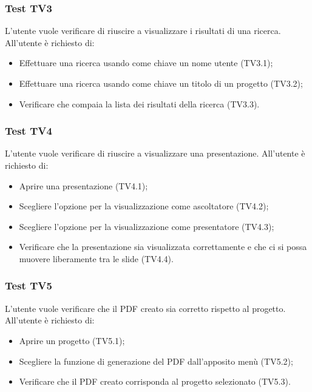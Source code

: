 \subsubsection{Test TV3}
L'utente vuole verificare di riuscire a visualizzare i risultati di una ricerca. \newline
All'utente è richiesto di:
\begin{itemize}
	\item Effettuare una ricerca usando come chiave un nome utente (TV3.1);
	\item Effettuare una ricerca usando come chiave un titolo di un progetto (TV3.2);
	\item Verificare che compaia la lista dei risultati della ricerca (TV3.3).
\end{itemize}

\subsubsection{Test TV4}
L'utente vuole verificare di riuscire a visualizzare una presentazione. \newline
All'utente è richiesto di:
\begin{itemize}
	\item Aprire una presentazione (TV4.1);
	\item Scegliere l'opzione per la visualizzazione come ascoltatore (TV4.2);
	\item Scegliere l'opzione per la visualizzazione come presentatore (TV4.3);
	\item Verificare che la presentazione sia visualizzata correttamente e che ci si possa muovere liberamente tra le \gls{slide} (TV4.4).
\end{itemize}

\subsubsection{Test TV5}
L'utente vuole verificare che il PDF creato sia corretto rispetto al progetto. \newline
All'utente è richiesto di:
\begin{itemize}
	\item Aprire un progetto (TV5.1);
	\item Scegliere la funzione di generazione del PDF dall'apposito menù (TV5.2);
	\item Verificare che il PDF creato corrisponda al progetto selezionato (TV5.3).
\end{itemize}


